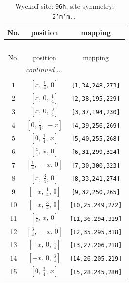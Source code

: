 \documentclass[fleqn,8pt]{jsarticle}
\begin{document}
\begin{longtable}{ccc}
\caption{Wyckoff site: {\tt 96h}, site symmetry: {\tt 2'm'm..}}
 \\
 \hline \hline
No. & position & mapping \\ \hline \endfirsthead

\multicolumn{2}{l}{\tablename\ \thetable{}} \\
 \hline \hline
No. & position & mapping \\ \hline \endhead

 \hline \hline
\multicolumn{2}{r}{\footnotesize\it continued ...} \\ \endfoot

 \hline \hline
\multicolumn{2}{r}{} \\ \endlastfoot

1 & $\left[ x,\, \frac{1}{4},\, 0 \right]$ & {\tt [1,34,248,273]} \\ \hline
2 & $\left[ x,\, 0,\, \frac{1}{4} \right]$ & {\tt [2,38,195,229]} \\ \hline
3 & $\left[ x,\, 0,\, \frac{3}{4} \right]$ & {\tt [3,37,194,230]} \\ \hline
4 & $\left[ 0,\, \frac{1}{4},\, - x \right]$ & {\tt [4,39,256,269]} \\ \hline
5 & $\left[ 0,\, \frac{1}{4},\, x \right]$ & {\tt [5,40,255,268]} \\ \hline
6 & $\left[ \frac{3}{4},\, x,\, 0 \right]$ & {\tt [6,31,299,324]} \\ \hline
7 & $\left[ \frac{1}{4},\, - x,\, 0 \right]$ & {\tt [7,30,300,323]} \\ \hline
8 & $\left[ x,\, \frac{3}{4},\, 0 \right]$ & {\tt [8,33,241,274]} \\ \hline
9 & $\left[ - x,\, \frac{1}{4},\, 0 \right]$ & {\tt [9,32,250,265]} \\ \hline
10 & $\left[ - x,\, \frac{3}{4},\, 0 \right]$ & {\tt [10,25,249,272]} \\ \hline
11 & $\left[ \frac{1}{4},\, x,\, 0 \right]$ & {\tt [11,36,294,319]} \\ \hline
12 & $\left[ \frac{3}{4},\, - x,\, 0 \right]$ & {\tt [12,35,295,318]} \\ \hline
13 & $\left[ - x,\, 0,\, \frac{1}{4} \right]$ & {\tt [13,27,206,218]} \\ \hline
14 & $\left[ - x,\, 0,\, \frac{3}{4} \right]$ & {\tt [14,26,205,219]} \\ \hline
15 & $\left[ 0,\, \frac{3}{4},\, x \right]$ & {\tt [15,28,245,280]} \\ \hline

\end{longtable}
\end{document}
